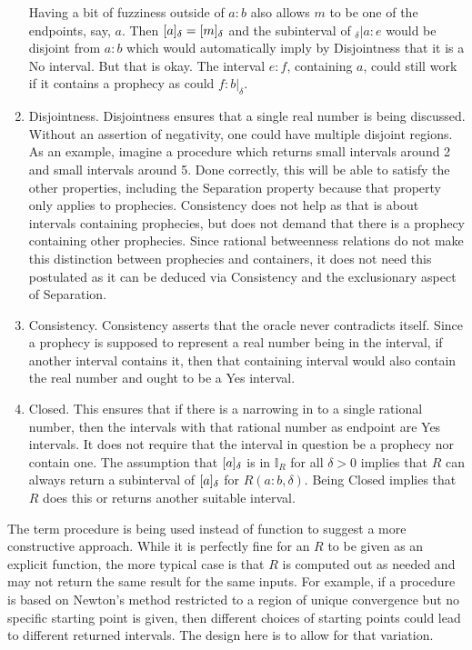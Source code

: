\documentclass[12pt]{article}
\begin{document}
\begin{enumerate}
    Having a bit of fuzziness outside of $a:b$ also allows $m$ to be one of the endpoints, say, $a$. Then $[a]_{\delta} = [m]_{\delta}$ and the subinterval of ${}_\delta | a : e$ would be disjoint from $a:b$ which would automatically imply by Disjointness that it is a No interval. But that is okay. The interval $e:f$, containing $a$, could still work if it contains a prophecy as could $f:b|_\delta$.
 
    \item Disjointness. Disjointness ensures that a single real number is being discussed. Without an assertion of negativity, one could have multiple disjoint regions.  As an example, imagine a procedure which returns small intervals around 2 and small intervals around 5. Done correctly, this will be able to satisfy the other properties, including the Separation property because that property only applies to prophecies. Consistency does not help as that is about intervals containing prophecies, but does not demand that there is a prophecy containing other prophecies.  Since rational betweenness relations do not make this distinction between prophecies and containers, it does not need this postulated as it can be deduced via Consistency and the exclusionary aspect of Separation. 
    
    \item Consistency. Consistency asserts that the oracle never contradicts itself. Since a prophecy is supposed to represent a real number being in the interval, if another interval contains it, then that containing interval would also contain the real number and ought to be a Yes interval. 
    
    \item Closed. This ensures that if there is a narrowing in to a single rational number, then the intervals with that rational number as endpoint are Yes intervals. It does not require that the interval in question be a prophecy nor contain one. The assumption that $[a]_{\delta}$ is in $\mathbb{I}_R$ for all $\delta >0$ implies that $R$ can always return a subinterval of $[a]_{\delta}$ for $R(a:b, \delta)$. Being Closed implies that $R$ does this or returns another suitable interval. 

\end{enumerate}

The term procedure is being used instead of function to suggest a more constructive approach. While it is perfectly fine for an $R$ to be given as an explicit function, the more typical case is that $R$ is computed out as needed and may not return the same result for the same inputs. For example, if a procedure is based on Newton's method restricted to a region of unique convergence but no specific starting point is given, then different choices of starting points could lead to different returned intervals. The design here is to allow for that variation. 
\end{document}
